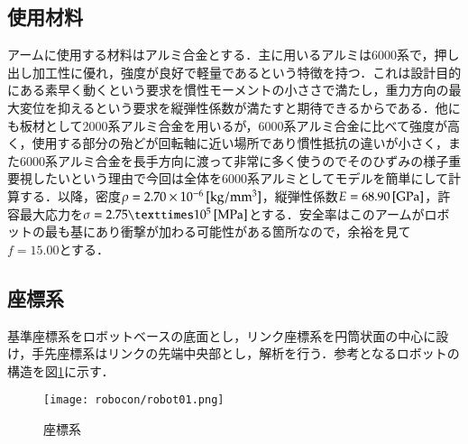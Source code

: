 \documentclass[10pt,b5paper,papersize,dvipdfmx]{jsbook}
\begin{document}
\subsection{使用材料}
アームに使用する材料はアルミ合金とする．主に用いるアルミは6000系で，押し出し加工性に優れ，強度が良好で軽量であるという特徴を持つ．これは設計目的にある素早く動くという要求を慣性モーメントの小ささで満たし，重力方向の最大変位を抑えるという要求を縦弾性係数が満たすと期待できるからである．他にも板材として2000系アルミ合金を用いるが，6000系アルミ合金に比べて強度が高く，使用する部分の殆どが回転軸に近い場所であり慣性抵抗の違いが小さく，また6000系アルミ合金を長手方向に渡って非常に多く使うのでそのひずみの様子重要視したいという理由で今回は全体を6000系アルミとしてモデルを簡単にして計算する．以降，密度$\rho=2.70\times 10^{-6}\tani*{kg/mm^3}$，縦弾性係数$E=68.90 \tani*{GPa}$，許容最大応力を$\sigma=2.75×10^{5} \tani*{MPa}$とする．安全率はこのアームがロボットの最も基にあり衝撃が加わる可能性がある箇所なので，余裕を見て$f=15.00$とする．
\subsection{座標系}\label{座標系}
基準座標系をロボットベースの底面とし，リンク座標系を円筒状面の中心に設け，手先座標系はリンクの先端中央部とし，解析を行う．参考となるロボットの構造を図\ref{fig:座標系}に示す．
\begin{figure}[htbp]
  \centering
  \texttt{[image: robocon/robot01.png]}
  \caption{座標系}
  \label{fig:座標系}
\end{figure}
\end{document}
